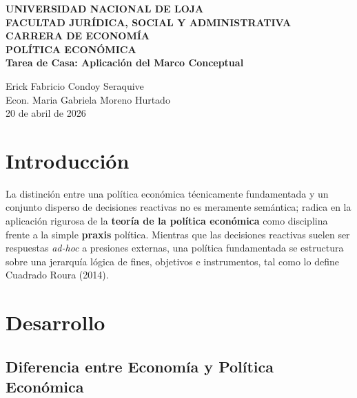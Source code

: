 \documentclass[12pt,spanish]{article}
\begin{document}
\begin{center}
    {\bfseries \Large UNIVERSIDAD NACIONAL DE LOJA}\\[0.3cm]
    {\bfseries \large FACULTAD JURÍDICA, SOCIAL Y
ADMINISTRATIVA}\\[0.2cm]
    {\bfseries CARRERA DE ECONOMÍA}\\[1.5cm]
    
    {\bfseries \large POLÍTICA ECONÓMICA}\\[1cm]
    
    {\bfseries \Large Tarea de Casa: Aplicación del Marco
Conceptual}\\[1.5cm]
\end{center}

 Erick Fabricio Condoy Seraquive \\
 Econ. Maria Gabriela Moreno Hurtado \\
 20 de abril de 2026 \\

\vspace{1cm}

\doublespacing
\setlength{\parindent}{1.27cm}

\section{Introducción}\label{introducciuxf3n}

La distinción entre una política económica técnicamente fundamentada y
un conjunto disperso de decisiones reactivas no es meramente semántica;
radica en la aplicación rigurosa de la \textbf{teoría de la política
económica} como disciplina frente a la simple \textbf{praxis} política.
Mientras que las decisiones reactivas suelen ser respuestas
\emph{ad-hoc} a presiones externas, una política fundamentada se
estructura sobre una jerarquía lógica de fines, objetivos e
instrumentos, tal como lo define Cuadrado Roura (2014).

\section{Desarrollo}\label{desarrollo}

\subsection{Diferencia entre Economía y Política
Económica}\label{diferencia-entre-economuxeda-y-poluxedtica-econuxf3mica}
\end{document}
